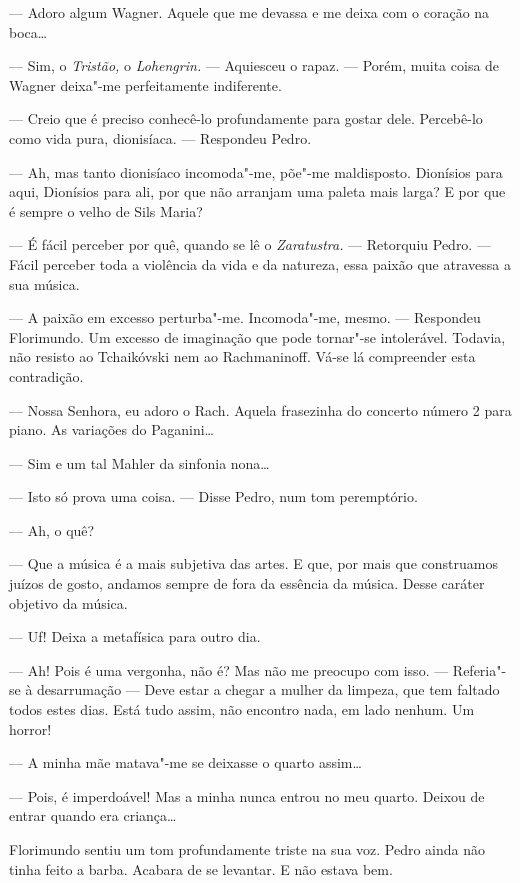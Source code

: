 --- Adoro algum Wagner. Aquele que me devassa e me deixa com o coração na
boca\ldots{}

--- Sim, o \emph{Tristão, }o \emph{Lohengrin. }--- Aquiesceu o rapaz. ---
Porém, muita coisa de Wagner deixa"-me perfeitamente indiferente.

--- Creio que é preciso conhecê-lo profundamente para gostar dele.
Percebê-lo como vida pura, dionisíaca. ---  Respondeu Pedro.

--- Ah, mas tanto dionisíaco incomoda"-me, põe"-me maldisposto. Dionísios
para aqui, Dionísios para ali, por que não arranjam uma paleta mais larga?
E por que é sempre o velho de Sils Maria?

--- É fácil perceber por quê, quando se lê o \emph{Zaratustra. }--- Retorquiu
Pedro. --- Fácil perceber toda a violência da vida e da natureza, essa
paixão que atravessa a sua música.

--- A paixão em excesso perturba"-me. Incomoda"-me, mesmo. --- Respondeu
Florimundo. Um excesso de imaginação que pode tornar"-se intolerável.
Todavia, não resisto ao Tchaikóvski nem ao Rachmaninoff. Vá-se lá
compreender esta contradição.

--- Nossa Senhora, eu adoro o Rach. Aquela frasezinha do concerto número 2
para piano. As variações do Paganini\ldots{}

--- Sim e um tal Mahler da sinfonia nona\ldots{}

--- Isto só prova uma coisa. --- Disse Pedro, num tom peremptório.

--- Ah, o quê?

--- Que a música é a mais subjetiva das artes. E que, por mais que
construamos juízos de gosto, andamos sempre de fora da essência da
música. Desse caráter objetivo da música.

--- Uf! Deixa a metafísica para outro dia.

--- Ah! Pois é uma vergonha, não é? Mas não me preocupo com isso. --- 
Referia"-se à desarrumação --- Deve estar a chegar a mulher da limpeza, que
tem faltado todos estes dias. Está tudo assim, não encontro nada, em
lado nenhum. Um horror!

--- A minha mãe matava"-me se deixasse o quarto assim\ldots{}

--- Pois, é imperdoável! Mas a minha nunca entrou no meu quarto. Deixou de
entrar quando era criança\ldots{}

Florimundo sentiu um tom profundamente triste na sua voz. Pedro ainda
não tinha feito a barba. Acabara de se levantar. E não estava bem.

